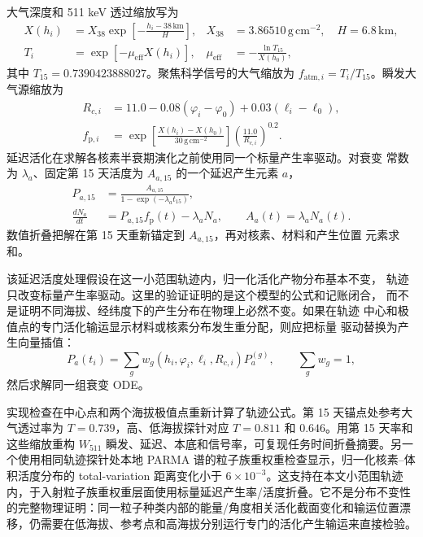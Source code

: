 \documentclass[preprint,12pt]{elsarticle}
\newcommand{\wii}{W_{511}}
\begin{document}
大气深度和 511 keV 透过缩放写为
\begin{align}
  X(h_i) &= X_{38}\exp\!\left[-\frac{h_i-38\,\mathrm{km}}{H}\right],
       & X_{38}&=3.86510\,\mathrm{g\,cm^{-2}},\quad H=6.8\,\mathrm{km},\\
  T_i &= \exp[-\mu_{\mathrm{eff}} X(h_i)],
       & \mu_{\mathrm{eff}}&=-\frac{\ln T_{15}}{X(h_0)},
\end{align}
其中 $T_{15}=0.7390423888027$。聚焦科学信号的大气缩放为
$f_{\mathrm{atm},i}=T_i/T_{15}$。瞬发大气源缩放为
\begin{align}
  R_{c,i} &= 11.0 -0.08(\varphi_i-\varphi_0)+0.03(\ell_i-\ell_0),\\
  f_{\mathrm{p},i} &=
  \exp\!\left[\frac{X(h_i)-X(h_0)}{30\,\mathrm{g\,cm^{-2}}}\right]
  \left(\frac{11.0}{R_{c,i}}\right)^{0.2}.
\end{align}
延迟活化在求解各核素半衰期演化之前使用同一个标量产生率驱动。对衰变
常数为 $\lambda_a$、固定第 15 天活度为 $A_{a,15}$ 的一个延迟产生元素
$a$，
\begin{align}
  P_{a,15} &= \frac{A_{a,15}}{1-\exp(-\lambda_a t_{15})},\\
  \frac{dN_a}{dt} &= P_{a,15}f_{\mathrm{p}}(t)-\lambda_a N_a,\qquad
  A_a(t)=\lambda_a N_a(t).
\end{align}
数值折叠把解在第 15 天重新锚定到 $A_{a,15}$，再对核素、材料和产生位置
元素求和。

该延迟活度处理假设在这一小范围轨迹内，归一化活化产物分布基本不变，
轨迹只改变标量产生率驱动。这里的验证证明的是这个模型的公式和记账闭合，
而不是证明不同海拔、经纬度下的产生分布在物理上必然不变。如果在轨迹
中心和极值点的专门活化输运显示材料或核素分布发生重分配，则应把标量
驱动替换为产生向量插值：
\begin{equation}
  P_a(t_i)=\sum_g w_g(h_i,\varphi_i,\ell_i,R_{c,i})P_a^{(g)},\qquad
  \sum_g w_g=1,
\end{equation}
然后求解同一组衰变 ODE。

实现检查在中心点和两个海拔极值点重新计算了轨迹公式。第 15 天锚点处参考大气透过率为 $T=0.739$，高、低海拔探针对应 $T=0.811$ 和 $0.646$。用第 15 天率和这些缩放重构 $\wii$ 瞬发、延迟、本底和信号率，可复现任务时间折叠摘要。另一个使用相同轨迹探针处本地 PARMA 谱的粒子族重权重检查显示，归一化核素--体积活度分布的 total-variation 距离变化小于 $6\times10^{-3}$。这支持在本文小范围轨迹内，于入射粒子族重权重层面使用标量延迟产生率/活度折叠。它不是分布不变性的完整物理证明：同一粒子种类内部的能量/角度相关活化截面变化和输运位置漂移，仍需要在低海拔、参考点和高海拔分别运行专门的活化产生输运来直接检验。
\end{document}
